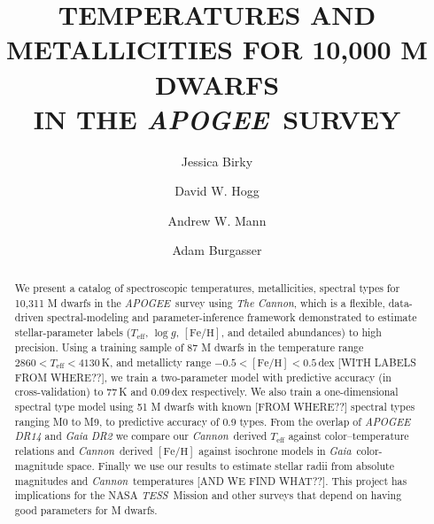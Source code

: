\documentclass[twocolumn]{aastex62}
\newcommand{\apogee}{\textsl{APOGEE}}
\newcommand{\thecannon}{\textsl{The Cannon}}
\newcommand{\cannon}{\textsl{Cannon}}
\newcommand{\gaia}{\textsl{Gaia}}
\newcommand{\tess}{\textsl{TESS}}
\newcommand{\teff}{T_{\mathrm{eff}}}
\newcommand{\logg}{\log g}
\newcommand{\feh}{[{\mathrm{Fe}/\mathrm{H}}]}
\begin{document}
\raggedbottom\sloppy\sloppypar\frenchspacing

\title{TEMPERATURES AND METALLICITIES FOR 10,000 M DWARFS\\ IN THE \apogee\ SURVEY}


\author[0000-0002-7961-6881]{Jessica Birky}

\author[0000-0003-2866-9403]{David W. Hogg}

\author[0000-0003-3654-1602]{Andrew W. Mann}

\author[0000-0002-6523-9536]{Adam Burgasser}

\begin{abstract}
We present a catalog of spectroscopic temperatures, metallicities,
spectral types for 10,311 M dwarfs in the \apogee\ survey using
\thecannon, which is a flexible, data-driven spectral-modeling and
parameter-inference framework demonstrated to estimate
stellar-parameter labels ($\teff$, $\logg$, $\feh$, and detailed
abundances) to high precision.
Using a training sample of 87 M dwarfs in the temperature range $2860
< \teff < 4130$\,K, and metallicty range $-0.5 < \feh < 0.5$\,dex
[WITH LABELS FROM WHERE??], we train a two-parameter model with
predictive accuracy (in cross-validation) to 77\,K and 0.09\,dex
respectively.
We also train a one-dimensional spectral type model using 51 M dwarfs
with known [FROM WHERE??] spectral types ranging M0 to M9, to predictive accuracy of
0.9 types.
From the overlap of \textsl{APOGEE DR14} and \textsl{Gaia DR2} we
compare our \cannon\ derived $\teff$ against color--temperature
relations and \cannon\ derived $\feh$ against isochrone models in
\gaia\ color-magnitude space.
Finally we use our results to
estimate stellar radii from absolute magnitudes and \cannon\ temperatures [AND WE FIND WHAT??].
This project has implications for the NASA \tess\ Mission and other
surveys that depend on having good parameters for M dwarfs.
\end{abstract}
\end{document}

